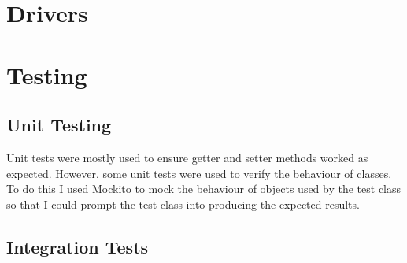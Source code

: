 \section{Drivers}
\label{sec:Drivers}


\section{Testing}
\label{sec:Testing}

\subsection{Unit Testing}
\label{subsec:Unit Testing}
Unit tests were mostly used to ensure getter and setter methods worked as expected. However, some unit tests were used to verify the behaviour of classes. To do this I used Mockito \citep{MockitoWebsite} to mock the behaviour of objects used by the test class so that I could prompt the test class into producing the expected results.

\subsection{Integration Tests}
\label{subsec:Integration Tests}

